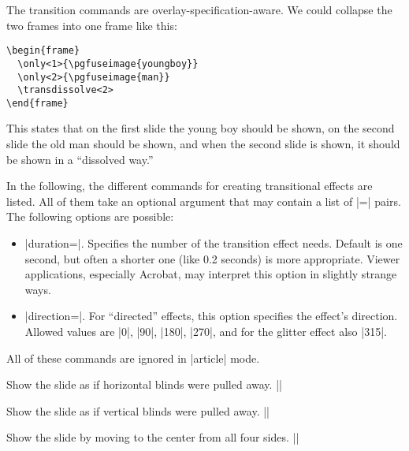 The transition commands are overlay-specification-aware. We could collapse the two frames into one frame like this:
\begin{verbatim}
\begin{frame}
  \only<1>{\pgfuseimage{youngboy}}
  \only<2>{\pgfuseimage{man}}
  \transdissolve<2>
\end{frame}
\end{verbatim}
This states that on the first slide the young boy should be shown, on the second slide the old man should be shown, and when the second slide is shown, it should be shown in a ``dissolved way.''

In the following, the different commands for creating transitional effects are listed. All of them take an optional argument that may contain a list of |=| pairs. The following options are possible:
\begin{itemize}
\item
  |duration=|. Specifies the number of  the transition effect needs. Default is one second, but often a shorter one (like 0.2 seconds) is more appropriate. Viewer applications, especially Acrobat, may interpret this option in slightly strange ways.
\item
  |direction=|. For ``directed'' effects, this option specifies the effect's direction. Allowed values are |0|, |90|, |180|, |270|, and for the glitter effect also |315|.
\end{itemize}

\articlenote
All of these commands are ignored in |article| mode.

\begin{command}{\transblindshorizontal{}}
  Show the slide as if horizontal blinds were pulled away.
  \example|\transblindshorizontal|
\end{command}

\begin{command}{\transblindsvertical{}}
  Show the slide as if vertical blinds were pulled away.
  \example||
\end{command}

\begin{command}{\transboxin{}}
  Show the slide by moving to the center from all four sides.
  \example||
\end{command}

